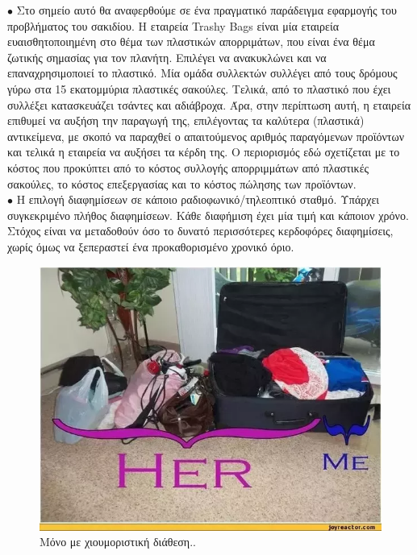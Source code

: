 \documentclass[12pt]{article}
\begin{document}
\(\bullet\) Στο σημείο αυτό θα αναφερθούμε σε ένα πραγματικό παράδειγμα εφαρμογής του προβλήματος του σακιδίου. Η εταιρεία Trashy Bags είναι μία εταιρεία ευαισθητοποιημένη στο θέμα των πλαστικών απορριμάτων, που είναι ένα θέμα ζωτικής σημασίας για τον πλανήτη. Επιλέγει να ανακυκλώνει και να επαναχρησιμοποιεί το πλαστικό. Μία ομάδα συλλεκτών συλλέγει από τους δρόμους γύρω στα 15 εκατομμύρια πλαστικές σακούλες. Τελικά, από το πλαστικό που έχει συλλέξει κατασκευάζει τσάντες και αδιάβροχα. Άρα, στην περίπτωση αυτή, η εταιρεία επιθυμεί να αυξήση την παραγωγή της, επιλέγοντας τα καλύτερα (πλαστικά) αντικείμενα, με σκοπό να παραχθεί ο απαιτούμενος  αριθμός  παραγόμενων προϊόντων και τελικά η εταιρεία να αυξήσει τα κέρδη της. Ο περιορισμός εδώ σχετίζεται με το κόστος που προκύπτει από το κόστος συλλογής απορριμμάτων από πλαστικές σακούλες,  το  κόστος  επεξεργασίας  και  το  κόστος  πώλησης  των προϊόντων. \\

\(\bullet\) Η επιλογή διαφημίσεων σε κάποιο ραδιοφωνικό/τηλεοπτικό σταθμό. Υπάρχει συγκεκριμένο πλήθος διαφημίσεων. Κάθε διαφήμιση έχει μία τιμή και κάποιον χρόνο. Στόχος είναι να μεταδοθούν όσο το δυνατό περισσότερες κερδοφόρες διαφημίσεις, χωρίς όμως να ξεπεραστεί ένα προκαθορισμένο χρονικό όριο. \\

\begin{figure}[!]
	\centering
	\includegraphics[scale=0.65]{./knapsack-example.png}
	\caption{Μόνο με χιουμοριστική διάθεση..}
\end{figure}
\end{document}
